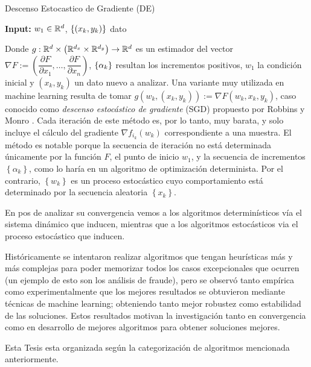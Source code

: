  \LinesNumbered
 \begin{algorithm}[H]
 	\caption{Descenso Estocastico de Gradiente (DE) \label{algo: DE - intro}}
 	\textbf{Input:} $w_1 \in {\mathbb{R}}^d$, $\left\lbrace(x_k, y_k)\right\rbrace$ dato \\
 \end{algorithm}

Donde $g : {\mathbb{R}}^d \times \left( {\mathbb{R}}^{d_x} \times {\mathbb{R}}^{d_y} \right) \rightarrow {\mathbb{R}}^d$ es un estimador del vector $\nabla F := \left(\dfrac{\partial F}{\partial x_1}, \dots, \dfrac{\partial F}{\partial x_n}\right)$, $\left\lbrace\alpha_k\right\rbrace$ resultan los incrementos positivos, $w_1$ la condici\'on inicial y $(x_k, y_k)$ un dato nuevo a analizar. Una variante muy utilizada en machine learning resulta de tomar $g(w_k, \left(x_k, y_k\right)) := \nabla F(w_k, x_k, y_k)$, caso conocido como \textit{descenso estoc\'astico de gradiente} (SGD) propuesto por Robbins y Monro \cite{robbins:1951}. Cada iteraci\'on de este m\'etodo es, por lo tanto, muy barata, y solo incluye el c\'alculo del gradiente $\nabla f_{i_k} (w_k)$ correspondiente a una muestra. El m\'etodo es notable porque la secuencia de iteraci\'on no est\'a determinada \'unicamente por la funci\'on $F$, el punto de inicio $w_1$, y la secuencia de incrementos $\left\lbrace \alpha _k \right\rbrace $, como lo har\'ia en un algoritmo de optimizaci\'on determinista. Por el contrario, $\left\lbrace w_k \right\rbrace $ es un proceso estoc\'astico cuyo comportamiento est\'a determinado por la secuencia aleatoria $\left\lbrace x_k \right\rbrace $.

En pos de analizar su convergencia vemos a los algoritmos determin\'isticos v\'ia el sistema din\'amico que inducen, mientras que a los algoritmos estoc\'asticos via el proceso estoc\'astico que inducen.

Hist\'oricamente se intentaron realizar algoritmos que tengan heur\'isticas m\'as y m\'as complejas para poder memorizar todos los casos excepcionales que ocurren (un ejemplo de esto son los an\'alisis de fraude), pero se observ\'o tanto emp\'irica como experimentalmente que los mejores resultados se obtuvieron mediante t\'ecnicas de machine learning; obteniendo tanto mejor robustez como estabilidad de las soluciones. Estos resultados motivan la investigaci\'on tanto en convergencia como en desarrollo de mejores algoritmos para obtener soluciones mejores.

Esta Tesis esta organizada seg\'un la categorizaci\'on de algoritmos mencionada anteriormente.

